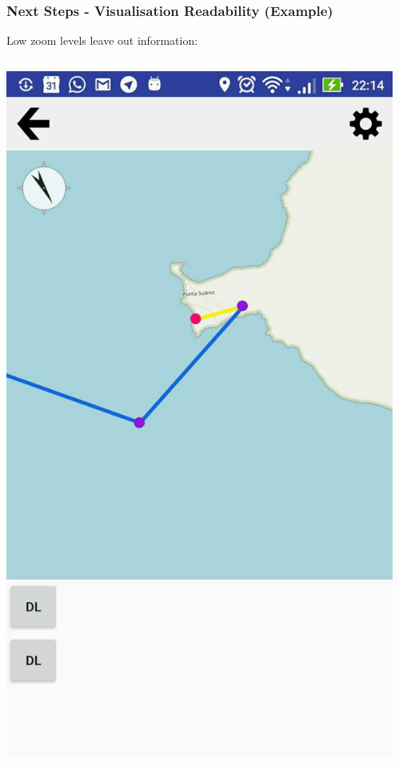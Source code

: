 \documentclass[xcolor=dvipsnames]{beamer}
\begin{document}
\begin{frame}
	\frametitle{Next Steps - Visualisation Readability (Example)}
	Low zoom levels leave out information:
	\begin{columns}
	\begin{column}{0.5\textwidth}
		\includegraphics[width=1\textwidth]{screenshots/vis-readability-1.jpg}
	\end{column}
	\begin{column}{0.5\textwidth}
		\begin{center}

\end{center}
\end{column}
\end{columns}
\end{frame}
\end{document}
